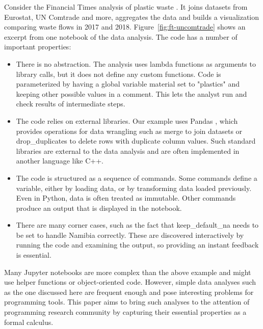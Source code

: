 \documentclass[english,crc]{programming}
\theoremstyle{plain}
\theoremstyle{definition}
\newcommand{\str}[1]{\textnormal{\textcolor{strclr}{\sffamily "#1"}}}
\newcommand{\ident}[1]{\textnormal{\textcolor{idclr}{\sffamily #1}}}
\begin{document}
Consider the Financial Times analysis of plastic waste \cite{ftnotebooks,ftarticle}. It joins
datasets from Eurostat, UN Comtrade and more, aggregates the data and
builds a visualization comparing waste flows in 2017 and 2018. Figure~\ref{fig:ft-uncomtrade} shows
an excerpt from one notebook of the data analysis. The code has a number of important properties:
%
\begin{itemize}
\vspace{0.5em}
\item There is no abstraction. The analysis uses lambda functions as arguments to library calls,
  but it does not define any custom functions. Code is parameterized by having a global variable
  \ident{material} set to \str{plastics} and keeping other possible values in a comment.
  This lets the analyst run and check results of intermediate steps.

\vspace{0.5em}
\item The code relies on external libraries. Our example uses Pandas \cite{pandas},
  which provides operations for data wrangling such as \ident{merge} to join datasets
  or \ident{drop\_duplicates} to delete rows with duplicate column values. Such standard libraries
  are external to the data analysis and are often implemented in another language like C++.

\vspace{0.5em}
\item The code is structured as a sequence of commands. Some commands define a variable, either by
  loading data, or by transforming data loaded previously. Even in Python, data is often treated
  as immutable. Other commands produce an output that is displayed in the notebook.

\vspace{0.5em}
\item There are many corner cases, such as the fact that \ident{keep\_default\_na}
  needs to be set to handle Namibia correctly. These are discovered interactively by
  running the code and examining the output, so providing an instant feedback is essential.
\end{itemize}

\vspace{0.5em}
\noindent
Many Jupyter notebooks are more complex than the above example and might use helper
functions or object-oriented code. However, simple data analyses such as the one discussed
here are frequent enough and pose interesting problems for programming tools.
This paper aims to bring such analyses to the attention of programming research community
by capturing their essential properties as a formal calculus.
\end{document}

